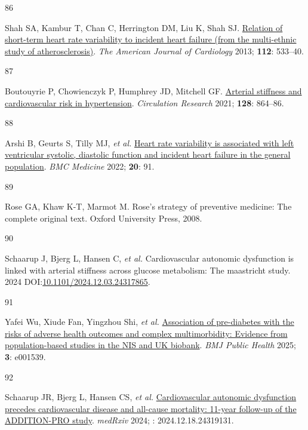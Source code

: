 \documentclass[
  a4paper,
  headsepline=true,
  open=any]{scrbook}
\newlength{\cslhangindent}
\newlength{\csllabelwidth}
\newlength{\cslentryspacingunit} %
\newenvironment{CSLReferences}[2] %
 {%
  \setlength{\parindent}{0pt}
  \ifodd #1
  \let\oldpar\par
  \def\par{\hangindent=\cslhangindent\oldpar}
  \fi
  \setlength{\parskip}{#2\cslentryspacingunit}
 }%
 {}
\newcommand{\CSLLeftMargin}[1]{\parbox[t]{\csllabelwidth}{#1}}
\newcommand{\CSLRightInline}[1]{\parbox[t]{\linewidth - \csllabelwidth}{#1}\break}
\begin{document}
\begin{CSLReferences}{0}{0}
\leavevmode{}%
\CSLLeftMargin{86 }%
\CSLRightInline{Shah SA, Kambur T, Chan C, Herrington DM, Liu K, Shah
SJ. \href{https://doi.org/10.1016/j.amjcard.2013.04.018}{Relation of
short-term heart rate variability to incident heart failure (from the
multi-ethnic study of atherosclerosis)}. \emph{The American Journal of
Cardiology} 2013; \textbf{112}: 533--40.}

\leavevmode{}%
\CSLLeftMargin{87 }%
\CSLRightInline{Boutouyrie P, Chowienczyk P, Humphrey JD, Mitchell GF.
\href{https://doi.org/10.1161/CIRCRESAHA.121.318061}{Arterial stiffness
and cardiovascular risk in hypertension}. \emph{Circulation Research}
2021; \textbf{128}: 864--86.}

\leavevmode{}%
\CSLLeftMargin{88 }%
\CSLRightInline{Arshi B, Geurts S, Tilly MJ, \emph{et al.}
\href{https://doi.org/10.1186/s12916-022-02273-9}{Heart rate variability
is associated with left ventricular systolic, diastolic function and
incident heart failure in the general population}. \emph{BMC Medicine}
2022; \textbf{20}: 91.}

\leavevmode{}%
\CSLLeftMargin{89 }%
\CSLRightInline{Rose GA, Khaw K-T, Marmot M. Rose's strategy of
preventive medicine: The complete original text. Oxford University
Press, 2008.}

\leavevmode{}%
\CSLLeftMargin{90 }%
\CSLRightInline{Schaarup J, Bjerg L, Hansen C, \emph{et al.}
Cardiovascular autonomic dysfunction is linked with arterial stiffness
across glucose metabolism: The maastricht study. 2024
DOI:\href{https://doi.org/10.1101/2024.12.03.24317865}{10.1101/2024.12.03.24317865}.}

\leavevmode{}%
\CSLLeftMargin{91 }%
\CSLRightInline{Yafei Wu, Xiude Fan, Yingzhou Shi, \emph{et al.}
\href{https://doi.org/10.1136/bmjph-2024-001539}{Association of
pre-diabetes with the risks of adverse health outcomes and complex
multimorbidity: Evidence from population-based studies in the NIS and UK
biobank}. \emph{BMJ Public Health} 2025; \textbf{3}: e001539.}

\leavevmode{}%
\CSLLeftMargin{92 }%
\CSLRightInline{Schaarup JR, Bjerg L, Hansen CS, \emph{et al.}
\href{https://doi.org/10.1101/2024.12.18.24319131}{Cardiovascular
autonomic dysfunction precedes cardiovascular disease and all-cause
mortality: 11-year follow-up of the ADDITION-PRO study}. \emph{medRxiv}
2024; : 2024.12.18.24319131.}


\end{CSLReferences}
\end{document}
